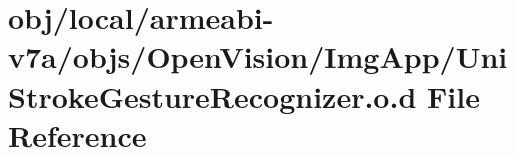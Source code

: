 \hypertarget{v7a_2objs_2_open_vision_2_img_app_2_uni_stroke_gesture_recognizer_8o_8d}{\section{obj/local/armeabi-\/v7a/objs/\-Open\-Vision/\-Img\-App/\-Uni\-Stroke\-Gesture\-Recognizer.o.\-d \-File \-Reference}
\label{v7a_2objs_2_open_vision_2_img_app_2_uni_stroke_gesture_recognizer_8o_8d}
}
